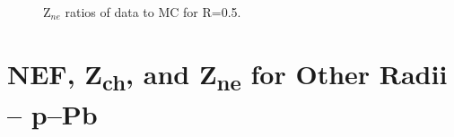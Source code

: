 \begin{figure}[h!]
    \qquad
    \caption{Z$_{ne}$ ratios of data to MC for R=0.5.}
    \label{fig:TriggerBiasRatiosZneR05}
\end{figure}

\section{NEF, \texorpdfstring{Z\textsubscript{ch}}{Zch}, and \texorpdfstring{Z\textsubscript{ne}}{Zne} for Other Radii -- p--Pb}
\label{sec:appendixTriggerBiaspPb}


